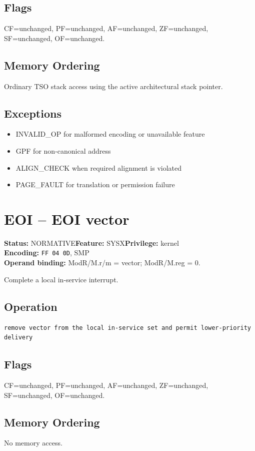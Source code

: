 \documentclass[10pt]{article}
\begin{document}
\subsection*{Flags}
CF=unchanged, PF=unchanged, AF=unchanged, ZF=unchanged, SF=unchanged, OF=unchanged.
\subsection*{Memory Ordering}
Ordinary TSO stack access using the active architectural stack pointer.
\subsection*{Exceptions}
\begin{itemize}
\item INVALID\_OP for malformed encoding or unavailable feature
\item GPF for non-canonical address
\item ALIGN\_CHECK when required alignment is violated
\item PAGE\_FAULT for translation or permission failure
\end{itemize}
\clearpage

\section{EOI -- EOI vector}
\textbf{Status:} NORMATIVE\quad \textbf{Feature:} SYSX\quad \textbf{Privilege:} kernel\\
\textbf{Encoding:} \texttt{FF 04 0D}, SMP\\
\textbf{Operand binding:} ModR/M.r/m = vector; ModR/M.reg = 0.

Complete a local in-service interrupt.

\subsection*{Operation}
\begin{lstlisting}
remove vector from the local in-service set and permit lower-priority delivery
\end{lstlisting}
\subsection*{Flags}
CF=unchanged, PF=unchanged, AF=unchanged, ZF=unchanged, SF=unchanged, OF=unchanged.
\subsection*{Memory Ordering}
No memory access.
\end{document}

